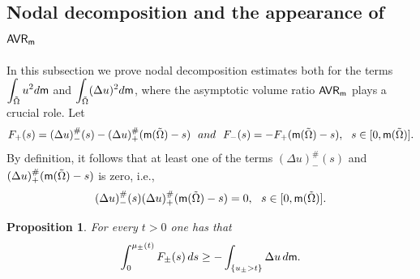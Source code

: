 \documentclass[11pt, reqno]{amsart}
\newcommand{\ds}{\displaystyle}
\newtheorem{proposition}{Proposition}[section]
\numberwithin{equation}{section}
\begin{document}
\subsection{Nodal decomposition and the appearance of ${\sf AVR}_{\sf m}$} In this subsection we prove nodal decomposition estimates both for the terms $\ds\int_{\tilde \Omega}u^2 {\rm d}{\sf m}$ and $\ds\int_{\tilde \Omega}(\Delta u)^2 {\rm d}{\sf m}$,   where the asymptotic volume ratio ${\sf AVR}_{\sf m}$ plays a crucial role.  Let 
\begin{equation}\label{definition-F-pm}
	F_+(s)=(\Delta u)^\#_-(s)-(\Delta u)^\#_+({\sf m}(\tilde \Omega)-s)\ \ {\rm and}\ \ F_-(s)=-F_+({\sf m}(\tilde \Omega)-s),\ \ s\in [0,{\sf m}(\tilde \Omega)].
\end{equation}
By definition, it follows that at least one of the terms   $(\Delta u)^\#_-(s)$ and $(\Delta u)^\#_+({\sf m}(\tilde \Omega)-s)$ is zero, i.e., 
\begin{equation}\label{simult=0}
	(\Delta u)^\#_-(s)(\Delta u)^\#_+({\sf m}(\tilde \Omega)-s)=0,\ \ s\in [0,{\sf m}(\tilde \Omega)].
\end{equation}









\begin{proposition} \label{f-hasonlitas}
	For every $t>0$ one has that 
	$$\ds\displaystyle\int_0^{\mu_\pm(t)} F_\pm(s)\, {\rm d}s\geq -\int_{\{u_\pm>t \}}\Delta u\,{\rm d}{\sf m}.$$
\end{proposition}
\end{document}
